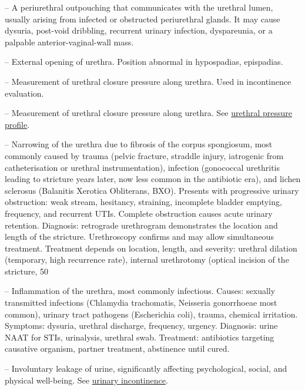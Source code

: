 -- A periurethral outpouching that communicates with the urethral lumen, usually arising from infected or obstructed periurethral glands. It may cause dysuria, post-void dribbling, recurrent urinary infection, dyspareunia, or a palpable anterior-vaginal-wall mass.

-- External opening of urethra. Position abnormal in hypospadias, epispadias.

-- Measurement of urethral closure pressure along urethra. Used in incontinence evaluation.

-- Measurement of urethral closure pressure along urethra. See \hyperlink{Urethral Pressure Profile}{urethral pressure profile}.

-- Narrowing of the urethra due to fibrosis of the corpus spongiosum, most commonly caused by trauma (pelvic fracture, straddle injury, iatrogenic from catheterisation or urethral instrumentation), infection (gonococcal urethritis leading to stricture years later, now less common in the antibiotic era), and lichen sclerosus (Balanitis Xerotica Obliterans, BXO). Presents with progressive urinary obstruction: weak stream, hesitancy, straining, incomplete bladder emptying, frequency, and recurrent UTIs. Complete obstruction causes acute urinary retention. Diagnosis: retrograde urethrogram demonstrates the location and length of the stricture. Urethroscopy confirms and may allow simultaneous treatment. Treatment depends on location, length, and severity: urethral dilation (temporary, high recurrence rate), internal urethrotomy (optical incision of the stricture, 50%

-- Inflammation of the urethra, most commonly infectious. Causes: sexually transmitted infections (Chlamydia trachomatis, Neisseria gonorrhoeae most common), urinary tract pathogens (Escherichia coli), trauma, chemical irritation. Symptoms: dysuria, urethral discharge, frequency, urgency. Diagnosis: urine NAAT for STIs, urinalysis, urethral swab. Treatment: antibiotics targeting causative organism, partner treatment, abstinence until cured.

-- Involuntary leakage of urine, significantly affecting psychological, social, and physical well-being. See \hyperlink{Urinary Incontinence}{urinary incontinence}.

